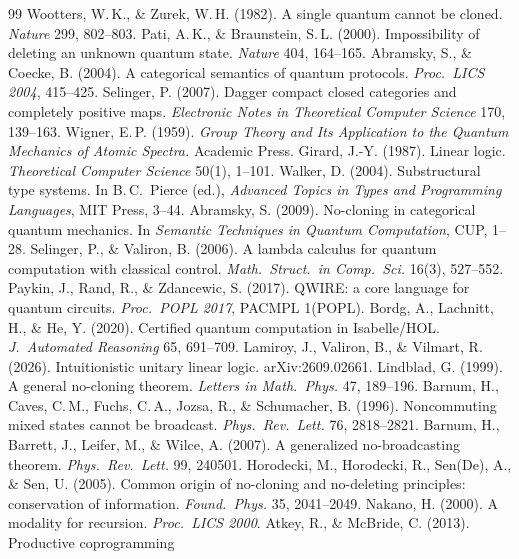 \documentclass[11pt]{article}
\begin{document}
\begin{thebibliography}{99}\small
{} Wootters, W.\,K., \& Zurek, W.\,H. (1982). A single quantum
  cannot be cloned. \emph{Nature} 299, 802--803.
 Pati, A.\,K., \& Braunstein, S.\,L. (2000). Impossibility of
  deleting an unknown quantum state. \emph{Nature} 404, 164--165.
 Abramsky, S., \& Coecke, B. (2004). A categorical semantics of
  quantum protocols. \emph{Proc.\ LICS 2004}, 415--425.
 Selinger, P. (2007). Dagger compact closed categories and
  completely positive maps. \emph{Electronic Notes in Theoretical Computer
  Science} 170, 139--163.
 Wigner, E.\,P. (1959). \emph{Group Theory and Its Application
  to the Quantum Mechanics of Atomic Spectra.} Academic Press.
 Girard, J.-Y. (1987). Linear logic. \emph{Theoretical
  Computer Science} 50(1), 1--101.
 Walker, D. (2004). Substructural type systems. In B.\,C.\
  Pierce (ed.), \emph{Advanced Topics in Types and Programming Languages},
  MIT Press, 3--44.
 Abramsky, S. (2009). No-cloning in categorical quantum
  mechanics. In \emph{Semantic Techniques in Quantum Computation}, CUP, 1--28.
\bibitem{SV06} Selinger, P., \& Valiron, B. (2006). A lambda calculus for
  quantum computation with classical control. \emph{Math.\ Struct.\ in
  Comp.\ Sci.} 16(3), 527--552.
 Paykin, J., Rand, R., \& Zdancewic, S. (2017). QWIRE: a core
  language for quantum circuits. \emph{Proc.\ POPL 2017}, PACMPL 1(POPL).
\bibitem{BHL20} Bordg, A., Lachnitt, H., \& He, Y. (2020). Certified quantum
  computation in Isabelle/HOL. \emph{J.\ Automated Reasoning} 65, 691--709.
\bibitem{ILV26} Lamiroy, J., Valiron, B., \& Vilmart, R. (2026).
  Intuitionistic unitary linear logic. arXiv:2609.02661.
 Lindblad, G. (1999). A general no-cloning theorem. \emph{
  Letters in Math.\ Phys.} 47, 189--196.
 Barnum, H., Caves, C.\,M., Fuchs, C.\,A., Jozsa, R., \&
  Schumacher, B. (1996). Noncommuting mixed states cannot be broadcast.
  \emph{Phys.\ Rev.\ Lett.} 76, 2818--2821.
 Barnum, H., Barrett, J., Leifer, M., \& Wilce, A. (2007).
  A generalized no-broadcasting theorem. \emph{Phys.\ Rev.\ Lett.} 99, 240501.
\bibitem{HHSS05} Horodecki, M., Horodecki, R., Sen(De), A., \& Sen, U.
  (2005). Common origin of no-cloning and no-deleting principles:
  conservation of information. \emph{Found.\ Phys.} 35, 2041--2049.
\bibitem{Nak00} Nakano, H. (2000). A modality for recursion. \emph{Proc.\
  LICS 2000}.
\bibitem{AM13} Atkey, R., \& McBride, C. (2013). Productive coprogramming

\end{thebibliography}
\end{document}
